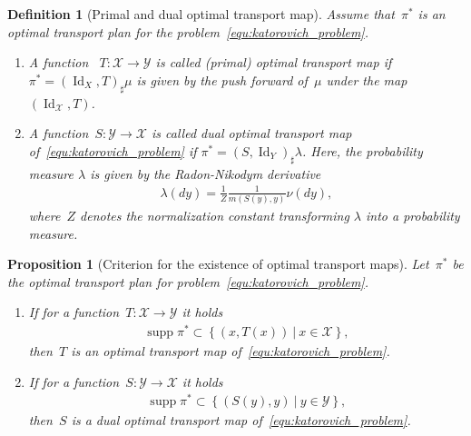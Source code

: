\documentclass{article}
\newtheorem{definition}[theorem]{Definition}
\newtheorem{proposition}[theorem]{Proposition}
\theoremstyle{definition}
\DeclareMathOperator{\Id}{Id}
\DeclareMathOperator{\supp}{supp}
\begin{document}
\begin{definition}[Primal and dual optimal transport map] \label{def:optimal_transport_maps}
    Assume that~$\pi^*$ is an optimal transport plan for the problem~\eqref{equ:katorovich_problem}. 
    \begin{enumerate}
        \item[(i)] A function ~$T: \mathcal{X} \to \mathcal{Y}$ is called (primal) optimal transport map if $\pi^*= (\Id_X , T)_{\sharp} \mu$  is given by the push forward of~$\mu$ under the map~$(\Id_{\mathcal{X}}, T)$.
        \item[(ii)] A function~$S: \mathcal{Y} \to \mathcal{X}$ is called dual optimal transport map of~\eqref{equ:katorovich_problem} if $\pi^*= (S , \Id_Y)_{\sharp} \lambda$. Here, the probability measure $\lambda$ is given by the Radon-Nikodym derivative 
        \begin{align*}
            \lambda(dy) =\frac{1}{Z} \frac{1}{m(S(y),y)} \nu(dy),
        \end{align*}
        where~$Z$ denotes the normalization constant transforming $\lambda$ into a probability measure. 
    \end{enumerate}
\end{definition}


 
\begin{proposition}[Criterion for the existence of optimal transport maps]\label{the:characterization_optimal_maps}
Let~$\pi^*$ be the optimal transport plan for problem~\eqref{equ:katorovich_problem}.
\begin{enumerate}
    \item[(i)] If for a function~$T: \mathcal{X} \to \mathcal{Y}$ it holds 
    \begin{align} \label{eq:support1}
        \supp \pi^* \subset \left\{ (x,T(x)) \ | \ x \in \mathcal{X} \right\},
    \end{align}
    then~$T$ is an optimal transport map of~\eqref{equ:katorovich_problem}.

    \item[(ii)] If for a function~$S: \mathcal{Y} \to \mathcal{X}$ it holds 
    \begin{align} \label{eq:support2}
        \supp \pi^* \subset \left\{ (S(y),y) \ | \ y \in \mathcal{Y} \right\},
    \end{align}
    then~$S$ is a dual optimal transport map of~\eqref{equ:katorovich_problem}.
\end{enumerate}
\end{proposition}    
    
\end{document}
